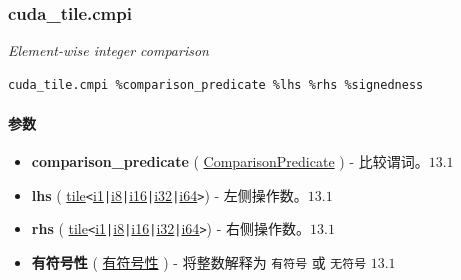 \documentclass{article}
\begin{document}
\subsubsection{cuda\_tile.cmpi}

\textit{Element-wise integer comparison}


\begin{lstlisting}
cuda_tile.cmpi %comparison_predicate %lhs %rhs %signedness
\end{lstlisting}

\paragraph{参数}

\begin{itemize}
\item \textbf{comparison\_predicate} ( \href{https://docs.nvidia.com/cuda/tile-ir/latest/sections/operations.html#op-attribute-cuda-tile-cmpi-comparisonpredicate-attr}{ComparisonPredicate} ) - 比较谓词。$\boxed{13.1}$
\item \textbf{lhs} ( \href{https://docs.nvidia.com/cuda/tile-ir/latest/sections/types.html#type-tile}{tile}\texttt{<}\href{https://docs.nvidia.com/cuda/tile-ir/latest/sections/types.html#subsection-element-types}{i1}\texttt{|}\href{https://docs.nvidia.com/cuda/tile-ir/latest/sections/types.html#subsection-element-types}{i8}\texttt{|}\href{https://docs.nvidia.com/cuda/tile-ir/latest/sections/types.html#subsection-element-types}{i16}\texttt{|}\href{https://docs.nvidia.com/cuda/tile-ir/latest/sections/types.html#subsection-element-types}{i32}\texttt{|}\href{https://docs.nvidia.com/cuda/tile-ir/latest/sections/types.html#subsection-element-types}{i64}\texttt{>}) - 左侧操作数。$\boxed{13.1}$
\item \textbf{rhs} ( \href{https://docs.nvidia.com/cuda/tile-ir/latest/sections/types.html#type-tile}{tile}\texttt{<}\href{https://docs.nvidia.com/cuda/tile-ir/latest/sections/types.html#subsection-element-types}{i1}\texttt{|}\href{https://docs.nvidia.com/cuda/tile-ir/latest/sections/types.html#subsection-element-types}{i8}\texttt{|}\href{https://docs.nvidia.com/cuda/tile-ir/latest/sections/types.html#subsection-element-types}{i16}\texttt{|}\href{https://docs.nvidia.com/cuda/tile-ir/latest/sections/types.html#subsection-element-types}{i32}\texttt{|}\href{https://docs.nvidia.com/cuda/tile-ir/latest/sections/types.html#subsection-element-types}{i64}\texttt{>}) - 右侧操作数。$\boxed{13.1}$
\item \textbf{有符号性} ( \href{https://docs.nvidia.com/cuda/tile-ir/latest/sections/operations.html#op-attribute-cuda-tile-cmpi-signedness-attr}{有符号性} ) - 将整数解释为 \texttt{有符号} 或 \texttt{无符号} $\boxed{13.1}$



\end{itemize}
\end{document}
